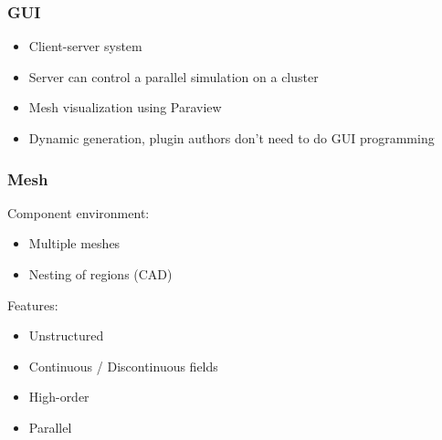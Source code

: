 \documentclass{beamer}
\begin{document}
\begin{frame}
 \frametitle{GUI}
 \begin{itemize}
  \item Client-server system
  \item Server can control a parallel simulation on a cluster
  \item Mesh visualization using Paraview
  \item Dynamic generation, plugin authors don't need to do GUI programming
 \end{itemize}
\end{frame}


\begin{frame}
  \frametitle{Mesh}
    \begin{block}{Component environment:}
    \begin{itemize}
      \item Multiple meshes
      \item Nesting of regions (CAD)
    \end{itemize}
    \end{block}
    \begin{block}{Features:}
    \begin{itemize}
      \item Unstructured
      \item Continuous / Discontinuous fields
      \item High-order
      \item Parallel
    \end{itemize}
  \end{block}
\end{frame}

\end{document}
